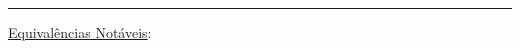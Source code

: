 \documentclass[11pt, a4paper,final]{article}
\begin{document}
\begin{enumerate}
\begin{comment}
\item {\bf (1.0 pt)} Apresente \textbf{todas as saídas na ordem} para a execução do predicado {\texttt go}:
\begin{verbatim}
	t(*) .
	t(#).
	r(a).
	r(b) .
	r(c).
	s(1).
	s(2).
	p(X, Y, Z) :- t( X ) , r( Y ) , s( Z ) .
	go :- p(X, Y, Z), write(X), write(Y), write(Z).
\end{verbatim}
\end{comment}

\end{enumerate}


\noindent\rule{0.8\textwidth}{2pt}



\underline{{\large Equivalências Notáveis}}:
\end{document}
